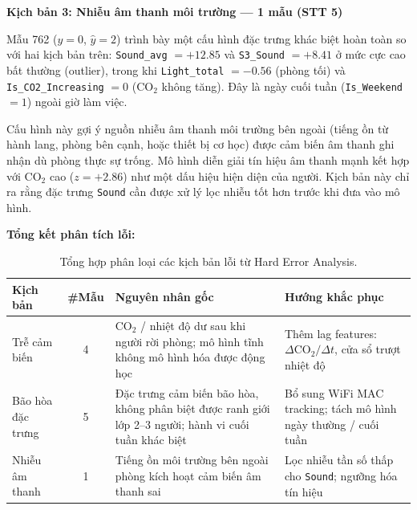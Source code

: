 \textbf{Kịch bản 3: Nhiễu âm thanh môi trường --- 1 mẫu (STT 5)}

Mẫu 762 ($y = 0$, $\hat{y} = 2$) trình bày một cấu hình đặc trưng 
khác biệt hoàn toàn so với hai kịch bản trên: \texttt{Sound\_avg} 
$= +12.85$ và \texttt{S3\_Sound} $= +8.41$ ở mức cực cao bất thường 
(outlier), trong khi \texttt{Light\_total} $= -0.56$ (phòng tối) và 
\texttt{Is\_CO2\_Increasing} $= 0$ (CO$_2$ không tăng). Đây là ngày 
cuối tuần (\texttt{Is\_Weekend} $= 1$) ngoài giờ làm việc.

Cấu hình này gợi ý nguồn nhiễu âm thanh môi trường bên ngoài 
(tiếng ồn từ hành lang, phòng bên cạnh, hoặc thiết bị cơ học) được 
cảm biến âm thanh ghi nhận dù phòng thực sự trống. Mô hình diễn 
giải tín hiệu âm thanh mạnh kết hợp với $\mathrm{CO}_2$ cao 
($z = +2.86$) như một dấu hiệu hiện diện của người. Kịch bản này 
chỉ ra rằng đặc trưng \texttt{Sound} cần được xử lý lọc nhiễu tốt 
hơn trước khi đưa vào mô hình.

\textbf{Tổng kết phân tích lỗi:}

\begin{table}[H]
\centering
\caption{Tổng hợp phân loại các kịch bản lỗi từ Hard Error Analysis.}
\label{tab:error_summary}
\renewcommand{\arraystretch}{1.4}
\begin{tabular}{|l|c|p{3.8cm}|p{4cm}|}
    \hline
    \textbf{Kịch bản} 
        & \textbf{\#Mẫu} 
        & \textbf{Nguyên nhân gốc} 
        & \textbf{Hướng khắc phục} \\
    \hline
    Trễ cảm biến 
        & 4 
        & CO$_2$ / nhiệt độ dư sau khi người rời phòng; 
          mô hình tĩnh không mô hình hóa được động học 
        & Thêm lag features: 
          $\Delta\mathrm{CO}_2/\Delta t$, 
          cửa sổ trượt nhiệt độ \\
    \hline
    Bão hòa đặc trưng 
        & 5 
        & Đặc trưng cảm biến bão hòa, không phân biệt 
          được ranh giới lớp 2--3 người; 
          hành vi cuối tuần khác biệt 
        & Bổ sung WiFi MAC tracking; 
          tách mô hình ngày thường / cuối tuần \\
    \hline
    Nhiễu âm thanh 
        & 1 
        & Tiếng ồn môi trường bên ngoài phòng 
          kích hoạt cảm biến âm thanh sai 
        & Lọc nhiễu tần số thấp cho 
          \texttt{Sound}; ngưỡng hóa tín hiệu \\
    \hline
\end{tabular}
\end{table}


\clearpage
